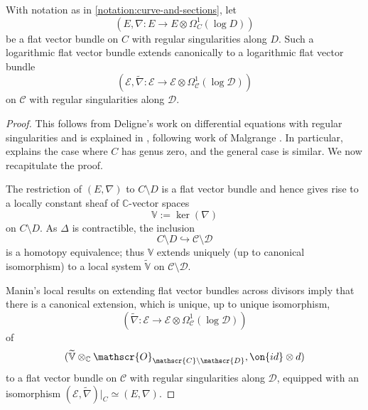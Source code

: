 \begin{lemma}
\notready
	\label{lemma:iso-extension}
	With notation as in \autoref{notation:curve-and-sections}, let $$(E, \nabla: E \to E\otimes \Omega^1_C(\log
	D))$$ be a flat vector bundle on $C$ with regular singularities along
	$D$. Such a logarithmic flat vector bundle extends canonically to a
	logarithmic flat vector bundle $$(\mathscr{E}, \widetilde{\nabla}:
	\mathscr{E}\to \mathscr{E}\otimes \Omega^1_{\mathscr{C}}(\log
\mathscr{D}))$$ on $\mathscr{C}$ with regular singularities along $\mathscr{D}$.
\end{lemma}
\begin{proof}
	This follows from Deligne's work on differential equations
with regular singularities \cite{deligne:regular-singular} and is explained in
\cite[Theorem 3.4]{Heu:universal-isomonodromic}, following work of Malgrange
\cite{malgrange:I,malgrange:II}.
In particular, \cite[Theoreme 2.1]{malgrange:I} explains the case where $C$ has
genus zero, and the general case is similar.
We now recapitulate the proof.

The restriction
of $({E}, \nabla)$ to $C\setminus D$ is a flat vector bundle and hence
gives rise to a locally constant sheaf of $\mathbb{C}$-vector spaces
$$\mathbb{V}:=\ker(\nabla)$$ on $C\setminus D$. As $\Delta$ is contractible, the
inclusion $$C\setminus D\hookrightarrow \mathscr{C}\setminus \mathscr{D}$$ is a
homotopy equivalence; thus $\mathbb{V}$ extends uniquely (up to canonical
isomorphism) to a local system $\widetilde{\mathbb{V}}$ on $\mathscr{C}\setminus
\mathscr{D}$.

Manin's local results on extending flat vector bundles across divisors
\cite[Proposition 5.4]{deligne:regular-singular} imply that there is a
canonical extension, which is unique, up to unique isomorphism,
$$(\widetilde{\nabla}:
\mathscr{E}\to \mathscr{E}\otimes \Omega^1_{\mathscr{C}}(\log \mathscr{D}))$$ of
$$(\widetilde{\mathbb V}\otimes_{\mathbb{C}}\mathscr{O}_{\mathscr{C}\setminus
\mathscr{D}}, \on{id}\otimes d)$$ to a flat vector bundle on $\mathscr{C}$ with
regular singularities along $\mathscr{D}$, equipped with an isomorphism
$({\mathscr{E}}, \widetilde{\nabla})|_C\simeq (E,\nabla).$
\end{proof}

